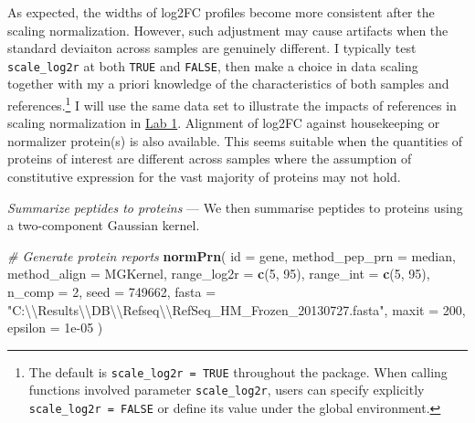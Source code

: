 \documentclass[]{article}
\newenvironment{Shaded}{\begin{snugshade}}{\end{snugshade}}
\newcommand{\CharTok}[1]{\textcolor[rgb]{0.31,0.60,0.02}{#1}}
\newcommand{\CommentTok}[1]{\textcolor[rgb]{0.56,0.35,0.01}{\textit{#1}}}
\newcommand{\DataTypeTok}[1]{\textcolor[rgb]{0.13,0.29,0.53}{#1}}
\newcommand{\DecValTok}[1]{\textcolor[rgb]{0.00,0.00,0.81}{#1}}
\newcommand{\FloatTok}[1]{\textcolor[rgb]{0.00,0.00,0.81}{#1}}
\newcommand{\KeywordTok}[1]{\textcolor[rgb]{0.13,0.29,0.53}{\textbf{#1}}}
\newcommand{\NormalTok}[1]{#1}
\newcommand{\StringTok}[1]{\textcolor[rgb]{0.31,0.60,0.02}{#1}}
\let\rmarkdownfootnote\footnote%
\def\footnote{\protect\rmarkdownfootnote}
\begin{document}
As expected, the widths of log2FC profiles become more consistent after
the scaling normalization. However, such adjustment may cause artifacts
when the standard deviaiton across samples are genuinely different. I
typically test \texttt{scale\_log2r} at both \texttt{TRUE} and
\texttt{FALSE}, then make a choice in data scaling together with my a
priori knowledge of the characteristics of both samples and
references.\footnote{The default is \texttt{scale\_log2r\ =\ TRUE}
  throughout the package. When calling functions involved parameter
  \texttt{scale\_log2r}, users can specify explicitly
  \texttt{scale\_log2r\ =\ FALSE} or define its value under the global
  environment.} I will use the same data set to illustrate the impacts
of references in scaling normalization in
\protect\hyperlink{ux5cux23ux5cux23ux5cux2520Labux5cux25201}{Lab 1}.
Alignment of log2FC against housekeeping or normalizer protein(s) is
also available. This seems suitable when the quantities of proteins of
interest are different across samples where the assumption of
constitutive expression for the vast majority of proteins may not hold.

\vspace{1.5cm}

\emph{Summarize peptides to proteins} --- We then summarise peptides to
proteins using a two-component Gaussian kernel.

\begin{Shaded}
\begin{Highlighting}[]
\CommentTok{# Generate protein reports}
\KeywordTok{normPrn}\NormalTok{(}
    \DataTypeTok{id =}\NormalTok{ gene, }
    \DataTypeTok{method_pep_prn =}\NormalTok{ median, }
    \DataTypeTok{method_align =}\NormalTok{ MGKernel, }
    \DataTypeTok{range_log2r =} \KeywordTok{c}\NormalTok{(}\DecValTok{5}\NormalTok{, }\DecValTok{95}\NormalTok{), }
    \DataTypeTok{range_int =} \KeywordTok{c}\NormalTok{(}\DecValTok{5}\NormalTok{, }\DecValTok{95}\NormalTok{), }
    \DataTypeTok{n_comp =} \DecValTok{2}\NormalTok{, }
    \DataTypeTok{seed =} \DecValTok{749662}\NormalTok{, }
    \DataTypeTok{fasta =} \StringTok{"C:}\CharTok{\textbackslash{}\textbackslash{}}\StringTok{Results}\CharTok{\textbackslash{}\textbackslash{}}\StringTok{DB}\CharTok{\textbackslash{}\textbackslash{}}\StringTok{Refseq}\CharTok{\textbackslash{}\textbackslash{}}\StringTok{RefSeq_HM_Frozen_20130727.fasta"}\NormalTok{, }
    \DataTypeTok{maxit =} \DecValTok{200}\NormalTok{, }
    \DataTypeTok{epsilon =} \FloatTok{1e-05}
\NormalTok{)}
\end{Highlighting}
\end{Shaded}
\end{document}
